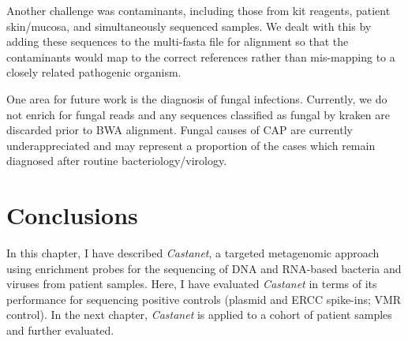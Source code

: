 Another challenge was contaminants, including those from kit reagents, patient skin/mucosa, and simultaneously sequenced samples. We dealt with this by adding these sequences to the multi-fasta file for alignment so that the contaminants would map to the correct references rather than mis-mapping to a closely related pathogenic organism. 

One area for future work is the diagnosis of fungal infections. Currently, we do not enrich for fungal reads and any sequences classified as fungal by kraken are discarded prior to BWA alignment. Fungal causes of CAP are currently underappreciated \parencite{Chen2001} and may represent a proportion of the cases which remain diagnosed after routine bacteriology/virology. 

\section{Conclusions}
In this chapter, I have described \textit{Castanet}, a targeted metagenomic approach using enrichment probes for the sequencing of DNA and RNA-based bacteria and viruses from patient samples. Here, I have evaluated \textit{Castanet} in terms of its performance for sequencing positive controls (plasmid and ERCC spike-ins; VMR control). In the next chapter, \textit{Castanet} is applied to a cohort of patient samples and further evaluated.

